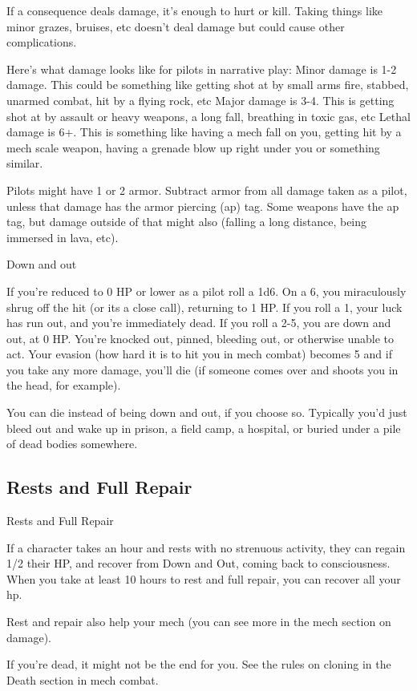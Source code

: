 If a consequence deals damage, it’s enough to hurt or kill. Taking things like minor grazes,
bruises, etc doesn’t deal damage but could cause other complications.

Here’s what damage looks like for pilots in narrative play:
Minor damage is 1-2 damage. This could be something like getting shot at by small arms fire,
stabbed, unarmed combat, hit by a flying rock, etc
Major damage is 3-4. This is getting shot at by assault or heavy weapons, a long fall, breathing
in toxic gas, etc
Lethal damage is 6+. This is something like having a mech fall on you, getting hit by a mech
scale weapon, having a grenade blow up right under you or something similar.

Pilots might have 1 or 2 armor. Subtract armor from all damage taken as a pilot, unless that
damage has the armor piercing (ap) tag. Some weapons have the ap tag, but damage outside of
that might also (falling a long distance, being immersed in lava, etc).

                                                 Down and out




If you’re reduced to 0 HP or lower as a pilot roll a 1d6. On a 6, you miraculously shrug off the hit
(or its a close call), returning to 1 HP. If you roll a 1, your luck has run out, and you’re immediately
dead. If you roll a 2-5, you are down and out, at 0 HP. You’re knocked out, pinned, bleeding out,
or otherwise unable to act. Your evasion (how hard it is to hit you in mech combat) becomes 5
and if you take any more damage, you’ll die (if someone comes over and shoots you in the head,
for example).


You can die instead of being down and out, if you choose so. Typically you’d just bleed out and
wake up in prison, a field camp, a hospital, or buried under a pile of dead bodies somewhere.

\subsection{Rests and Full Repair}

                                         Rests and Full Repair

If a character takes an hour and rests with no strenuous activity, they can regain 1/2 their HP, and
recover from Down and Out, coming back to consciousness. When you take at least 10 hours to
rest and full repair, you can recover all your hp.


Rest and repair also help your mech (you can see more in the mech section on damage).


If you’re dead, it might not be the end for you. See the rules on cloning in the Death section in
mech combat.